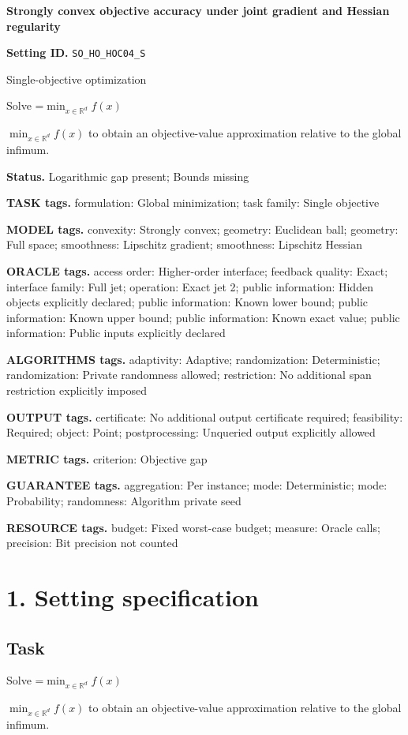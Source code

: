 \documentclass[10pt,a4paper]{article}
\newcommand{\AtlasMath}[1]{\par\begingroup\centering\setbox0=\hbox{$\displaystyle #1$}\ifdim\wd0>1.4\linewidth\typeout{ATLAS WIDE FORMULA: \the\wd0}\fi\ifdim\wd0>\linewidth\resizebox{\linewidth}{!}{\box0}\else\box0\fi\par\endgroup}
\newcommand{\AtlasInlineMath}[1]{\begingroup\setbox0=\hbox{$#1$}\ifdim\wd0>.4\linewidth\endgroup\AtlasMath{#1}\else\endgroup$#1$\fi}
\begin{document}
\raggedright

{\LARGE\bfseries\sffamily\color{AtlasNavy} Strongly convex objective accuracy under joint gradient and Hessian regularity\par}\vspace{5pt}
\textbf{Setting ID.} \texttt{SO\_\allowbreak{}HO\_\allowbreak{}HOC04\_\allowbreak{}S}

Single-objective optimization

Solve \AtlasInlineMath{\min_{x\in \mathbb{R}^d}f(x)} to obtain an objective-value approximation relative to the global infimum.

\textbf{Status.} Logarithmic gap present; Bounds missing

\textbf{TASK tags.} formulation: Global minimization; task family: Single objective

\textbf{MODEL tags.} convexity: Strongly convex; geometry: Euclidean ball; geometry: Full space; smoothness: Lipschitz gradient; smoothness: Lipschitz Hessian

\textbf{ORACLE tags.} access order: Higher-order interface; feedback quality: Exact; interface family: Full jet; operation: Exact jet 2; public information: Hidden objects explicitly declared; public information: Known lower bound; public information: Known upper bound; public information: Known exact value; public information: Public inputs explicitly declared

\textbf{ALGORITHMS tags.} adaptivity: Adaptive; randomization: Deterministic; randomization: Private randomness allowed; restriction: No additional span restriction explicitly imposed

\textbf{OUTPUT tags.} certificate: No additional output certificate required; feasibility: Required; object: Point; postprocessing: Unqueried output explicitly allowed

\textbf{METRIC tags.} criterion: Objective gap

\textbf{GUARANTEE tags.} aggregation: Per instance; mode: Deterministic; mode: Probability; randomness: Algorithm private seed

\textbf{RESOURCE tags.} budget: Fixed worst-case budget; measure: Oracle calls; precision: Bit precision not counted

\section{1. Setting specification}
\subsection{Task}
Solve \AtlasInlineMath{\min_{x\in \mathbb{R}^d}f(x)} to obtain an objective-value approximation relative to the global infimum.
\end{document}
